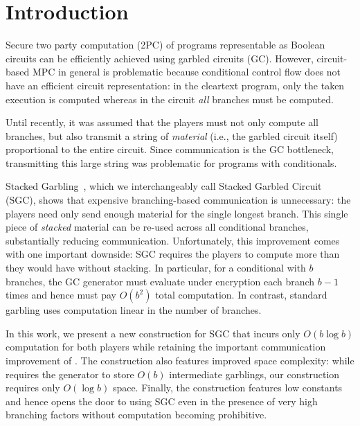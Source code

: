 \section{Introduction}\label{sec:intro}

Secure two party computation (2PC) of programs representable as Boolean circuits can be efficiently achieved using garbled circuits (GC).
%
However,  circuit-based MPC in general is problematic because conditional
control flow does not have an efficient circuit representation:
in the cleartext program, only the taken execution is computed whereas in
the circuit \emph{all} branches must be computed.

%
Until recently, it was assumed that the players must not only compute
all branches, but also transmit a string of \emph{material} (i.e., the garbled circuit itself) 
proportional to the entire circuit.  
Since communication is the GC bottleneck, transmitting this large string was
problematic for programs with conditionals.

Stacked Garbling~\HK, which we %
interchangeably call Stacked Garbled Circuit (SGC), shows that
expensive branching-based communication is unnecessary: the players need only
send enough material for the single longest branch. This single
piece of \emph{stacked} material can be re-used across all conditional branches,
substantially reducing communication.
%
Unfortunately, this improvement comes with one important downside:
SGC requires the players to compute more than they would have without stacking.
In particular, for a conditional with $b$ branches, the \HK GC
generator must evaluate under encryption each branch $b-1$ times and
hence must pay $O(b^2)$ total computation.
In contrast, standard garbling uses computation linear in the number
of branches.

In this work, we present a new construction for SGC that incurs
only $O(b \log b)$ computation for both players while
retaining the important communication improvement of \HK.
%
The construction also features improved space complexity: while \HK
requires the generator to store $O(b)$ intermediate garblings, our
construction requires only $O(\log b)$ space.
%
Finally, the construction features low constants and hence opens the
door to using SGC even in the presence of very high branching factors
without computation becoming prohibitive.


